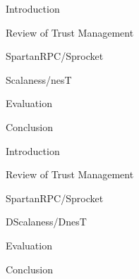 
\centerline{}
\stopslide


\begin{cenumerate}
\item Introduction
\item Review of Trust Management
\item SpartanRPC/Sprocket
\item {}
\item Scalaness/nesT
\item Evaluation
\item Conclusion
\end{cenumerate}
\stopslide


\begin{cenumerate}
\item Introduction
\item Review of Trust Management
\item SpartanRPC/Sprocket
\item DScalaness/DnesT
\item {}
\item Evaluation
\item Conclusion
\end{cenumerate}
\stopslide

